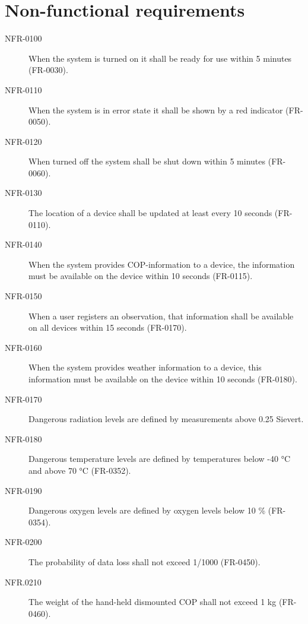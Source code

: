 \section{Non-functional requirements}
\begin{description}
\item[NFR-0100] When the system is turned on it shall be ready for use within 5 minutes (FR-0030).
\item[NFR-0110] When the system is in error state it shall be shown by a red indicator (FR-0050).
\item[NFR-0120] When turned off the system shall be shut down within 5 minutes (FR-0060).
\item[NFR-0130] The location of a device shall be updated at least every 10 seconds (FR-0110).
\item[NFR-0140] When the system provides COP-information to a device, the information must be available on the device within 10 seconds (FR-0115).
\item[NFR-0150] When a user registers an observation, that information shall be available on all devices within 15 seconds (FR-0170).
\item[NFR-0160] When the system provides weather information to a device, this information must be available on the device within 10 seconds (FR-0180).
\item[NFR-0170] Dangerous radiation levels are defined by measurements above 0.25 Sievert.
\item[NFR-0180] Dangerous temperature levels are defined by temperatures below -40 °C and above 70 °C (FR-0352).
\item[NFR-0190] Dangerous oxygen levels are defined by oxygen levels below 10 \% (FR-0354).
\item[NFR-0200] The probability of data loss shall not exceed 1/1000 (FR-0450).
\item[NFR.0210] The weight of the hand-held dismounted COP shall not exceed 1 kg (FR-0460).
\end{description}
